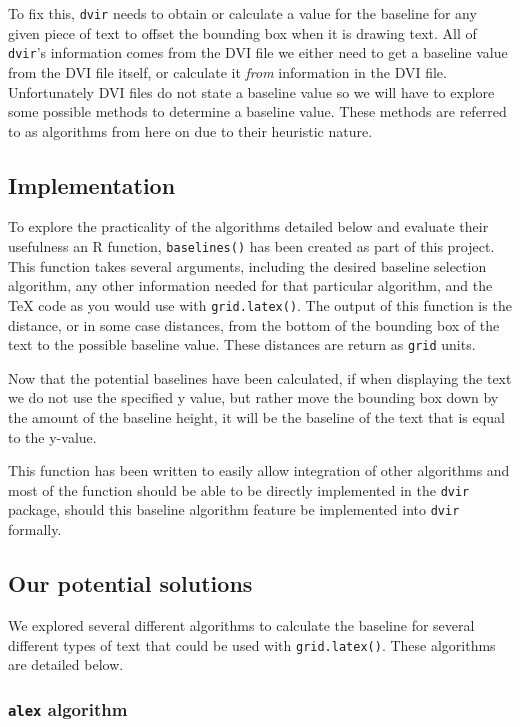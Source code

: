 \documentclass[]{article}
\begin{document}
To fix this, \texttt{dvir} needs to obtain or calculate a value for the
baseline for any given piece of text to offset the bounding box when it
is drawing text. All of \texttt{dvir}'s information comes from the DVI
file we either need to get a baseline value from the DVI file itself, or
calculate it \emph{from} information in the DVI file. Unfortunately DVI
files do not state a baseline value so we will have to explore some
possible methods to determine a baseline value. These methods are
referred to as algorithms from here on due to their heuristic nature.

\subsection{Implementation}\label{implementation}

To explore the practicality of the algorithms detailed below and
evaluate their usefulness an R function, \texttt{baselines()} has been
created as part of this project. This function takes several arguments,
including the desired baseline selection algorithm, any other
information needed for that particular algorithm, and the \TeX{} code as
you would use with \texttt{grid.latex()}. The output of this function is
the distance, or in some case distances, from the bottom of the bounding
box of the text to the possible baseline value. These distances are
return as \texttt{grid} units.

Now that the potential baselines have been calculated, if when
displaying the text we do not use the specified y value, but rather move
the bounding box down by the amount of the baseline height, it will be
the baseline of the text that is equal to the y-value.

This function has been written to easily allow integration of other
algorithms and most of the function should be able to be directly
implemented in the \texttt{dvir} package, should this baseline algorithm
feature be implemented into \texttt{dvir} formally.

\subsection{Our potential solutions}\label{our-potential-solutions}

We explored several different algorithms to calculate the baseline for
several different types of text that could be used with
\texttt{grid.latex()}. These algorithms are detailed below.

\subsubsection{\texorpdfstring{\texttt{alex}
algorithm}{alex algorithm}}\label{alex-algorithm}
\end{document}

